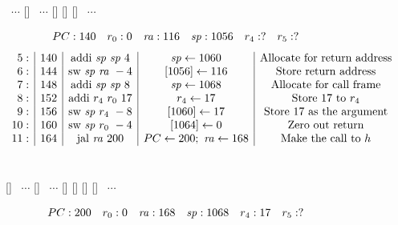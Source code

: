 \documentclass[acmsmall,review,anonymous]{acmart}\settopmatter{printfolios=true,printccs=false,printacmref=false}
\begin{document}
\begin{figure}
\begin{center}
~$\cdots$
[{}]%
~$\cdots$
[{}]%
[{}]%
[{}]
~$\cdots$
\\
\end{center}
\[
\begin{array}{cccccc}
  PC: 140 & r_0 : 0 & \mathit{ra} : 116 & \mathit{sp} : 1056 & r_4 : ? & r_5 : ? 
\end{array}
\]
\vspace*{0.2em}
\[
  \begin{array}{r|c|c|c|c}
    5: & 140 & \text{addi} ~ \mathit{sp} ~ \mathit{sp} ~ 4 & \mathit{sp} \leftarrow 1060 & \text{Allocate for return address}\\
    6: & 144 & \text{sw} ~ \mathit{sp} ~ \mathit{ra} ~ -4 & [1056] \leftarrow 116 & \text{Store return address}\\
    7: & 148 & \text{addi} ~ \mathit{sp} ~ \mathit{sp} ~ 8 & \mathit{sp} \leftarrow 1068 & \text{Allocate for call frame}\\
    8: & 152 & \text{addi} ~ r_4 ~ r_0 ~ 17 & r_4 \leftarrow 17 & \text{Store 17 to $r_4$}\\
    9: & 156 & \text{sw} ~ \mathit{sp} ~ r_4 ~ -8 & [1060] \leftarrow 17 & \text{Store 17 as the argument}\\
    10: & 160 & \text{sw} ~ \mathit{sp} ~ r_0 ~ -4 & [1064] \leftarrow 0  & \text{Zero out return}\\
    11: & 164 & \text{jal} ~ \mathit{ra} ~ 200 & PC \leftarrow 200; ~ \mathit{ra} \leftarrow 168 & \text{Make the call to $h$}\\
  \end{array}
  \]
  ~ \\
\begin{center}
\MemoryLabel{49em}{1.8em}{$\downarrow$}
[{}]%
~$\cdots$
[{}]%
~$\cdots$
[{}]%
[{}]%
[{}]%
[{}]
~$\cdots$
\\
\end{center}
\[
\begin{array}{cccccc}
  PC: 200 & r_0 : 0 & \mathit{ra} : 168 & \mathit{sp} : 1068 & r_4 : 17 & r_5 : ? 
\end{array}
\]
\end{figure}
\end{document}
